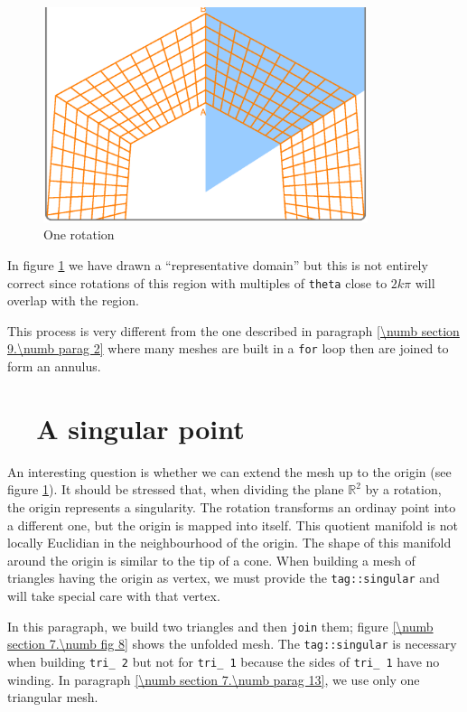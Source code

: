 \begin{figure}[ht] \centering
  \includegraphics[width=95mm]{sector-1.eps}
  \caption{One rotation}
  \label{\numb section 7.\numb fig 7}
\end{figure}

In figure \ref{\numb section 7.\numb fig 7}
we have drawn a ``representative domain'' but this is not entirely correct since
rotations of this region with multiples of {\small\tt theta} close to $ 2k\pi $
will overlap with the region.

This process is very different from the one described in paragraph
\ref{\numb section 9.\numb parag 2}
where many meshes are built in a {\small\tt for} loop then are joined to form an annulus.


\section{~~A singular point}\label{\numb section 7.\numb parag 12}

An interesting question is whether we can extend the mesh up to the origin
(see figure \ref{\numb section 7.\numb fig 7}).
It should be stressed that, when dividing the plane $ \mathbb{R}^2 $ by a rotation,
the origin represents a singularity.
The rotation transforms an ordinay point into a different one,
but the origin is mapped into itself.
This quotient manifold is not locally Euclidian in the neighbourhood of the origin.
The shape of this manifold around the origin is similar to the tip of a cone.
When building a mesh of triangles having the origin as vertex,
we must provide the {\small\tt\textcolor{tag}{tag}::singular}
and {\maniFEM} will take special care with that vertex.

In this paragraph, we build two triangles and then {\small\tt join} them;
figure \ref{\numb section 7.\numb fig 8} shows the unfolded mesh.
The {\small\tt\textcolor{tag}{tag}::singular} is necessary when building
{\small\tt tri\_\,2} but not for {\small\tt tri\_\,1}
because the sides of {\small\tt tri\_\,1} have no winding.
In paragraph \ref{\numb section 7.\numb parag 13}, we use only one triangular mesh.

